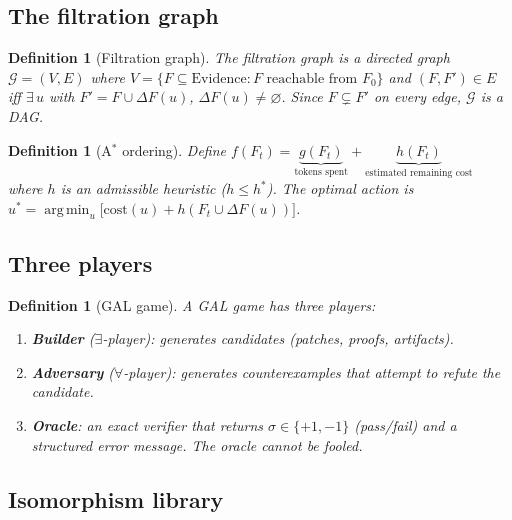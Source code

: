 \documentclass{article}
\newtheorem{definition}[theorem]{Definition}
\DeclareMathOperator*{\argmin}{arg\,min}
\newcommand{\calG}{\mathcal{G}}
\begin{document}
\subsection{The filtration graph}

\begin{definition}[Filtration graph]\label{def:filt-graph}
The \emph{filtration graph} is a directed graph
$\calG = (V, E)$ where
$V = \{F \subseteq \mathrm{Evidence} : F \text{ reachable from }
F_0\}$
and $(F, F') \in E$ iff $\exists\,u$ with
$F' = F \cup \Delta F(u)$, $\Delta F(u) \neq \varnothing$.
Since $F \subsetneq F'$ on every edge, $\calG$ is a DAG.
\end{definition}

\begin{definition}[A$^*$ ordering]\label{def:astar}
Define
$f(F_t) = \underbrace{g(F_t)}_{\text{tokens spent}}
+ \underbrace{h(F_t)}_{\text{estimated remaining cost}}$
where $h$ is an admissible heuristic ($h \leq h^*$).
The optimal action is
$u^* = \argmin_u \bigl[\mathrm{cost}(u) + h(F_t \cup \Delta F(u))\bigr]$.
\end{definition}

\subsection{Three players}

\begin{definition}[GAL game]\label{def:gal-game}
A GAL game has three players:
\begin{enumerate}[label=(\roman*),nosep]
  \item \textbf{Builder} ($\exists$-player): generates candidates
    (patches, proofs, artifacts).
  \item \textbf{Adversary} ($\forall$-player): generates
    counterexamples that attempt to refute the candidate.
  \item \textbf{Oracle}: an exact verifier that returns
    $\sigma \in \{+1, -1\}$ (pass/fail) and a structured error
    message.  The oracle cannot be fooled.
\end{enumerate}
\end{definition}

\subsection{Isomorphism library}
\end{document}
